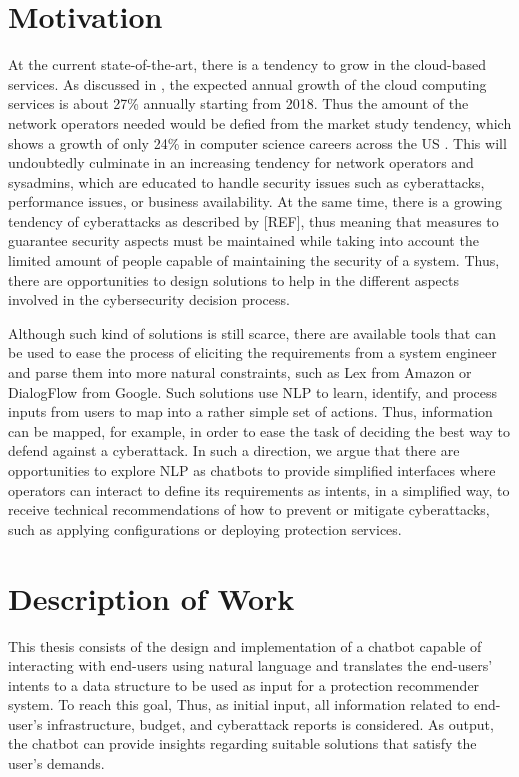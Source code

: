 \section{Motivation}
At the current state-of-the-art, there is a tendency to grow in the cloud-based services. As discussed in \cite{growth2}, the expected annual growth of the cloud computing services is about 27\% annually starting from 2018. Thus the amount of the network operators needed would be defied from the market study tendency, which shows a growth of only 24\% in computer science careers across the US \cite{computerScienceStudents}. This will undoubtedly culminate in an increasing tendency for network operators and sysadmins, which are educated to handle security issues such as cyberattacks, performance issues, or business availability. At the same time, there is a growing tendency of cyberattacks as described by [REF], thus meaning that measures to guarantee security aspects must be maintained while taking into account the limited amount of people capable of maintaining the security of a system. Thus, there are opportunities to design solutions to help in the different aspects involved in the cybersecurity decision process.

Although such kind of solutions is still scarce, there are available tools that can be used to ease the process of eliciting the requirements from a system engineer and parse them into more natural constraints, such as Lex from Amazon or DialogFlow from Google. Such solutions use NLP to learn, identify, and process inputs from users to map into a rather simple set of actions. Thus, information can be mapped, for example, in order to ease the task of deciding the best way to defend against a cyberattack. In such a direction, we argue that there are opportunities to explore NLP as chatbots to provide simplified interfaces where operators can interact to define its requirements as intents, in a simplified way, to receive technical recommendations of how to prevent or mitigate cyberattacks, such as applying configurations or deploying protection services.


\section{Description of Work}
This thesis consists of the design and implementation of a chatbot capable of interacting with
end-users using natural language and translates the end-users' intents to a data structure to be
used as input for a protection recommender system. To reach this goal, Thus, as initial input, all information related to end-user's infrastructure, budget, and cyberattack reports is considered. As output, the chatbot can provide insights regarding suitable solutions that satisfy the user's demands.

